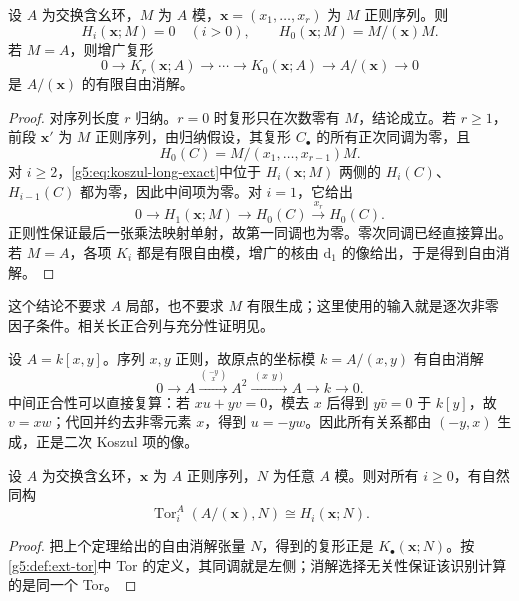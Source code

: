 \begin{theorem}\label{g5:thm:regular-koszul-acyclic}
	设 \(A\) 为交换含幺环，\(M\) 为 \(A\) 模，\(\mathbf x=(x_1,\ldots,x_r)\) 为 \(M\) 正则序列。则
	\[
		H_i(\mathbf x;M)=0\quad(i>0),\qquad
		H_0(\mathbf x;M)=M/(\mathbf x)M.
	\]
	若 \(M=A\)，则增广复形
	\[
		0\longrightarrow K_r(\mathbf x;A)\longrightarrow\cdots
		\longrightarrow K_0(\mathbf x;A)
		\longrightarrow A/(\mathbf x)\longrightarrow0
	\]
	是 \(A/(\mathbf x)\) 的有限自由消解。
\end{theorem}
\begin{proof}
	对序列长度 \(r\) 归纳。\(r=0\) 时复形只在次数零有 \(M\)，结论成立。若 \(r\geq1\)，前段 \(\mathbf x'\) 为 \(M\) 正则序列，由归纳假设，其复形 \(C_\bullet\) 的所有正次同调为零，且
	\[
		H_0(C)=M/(x_1,\ldots,x_{r-1})M.
	\]
	对 \(i\geq2\)，\eqref{g5:eq:koszul-long-exact}中位于 \(H_i(\mathbf x;M)\) 两侧的 \(H_i(C)\)、\(H_{i-1}(C)\) 都为零，因此中间项为零。对 \(i=1\)，它给出
	\[
		0\longrightarrow H_1(\mathbf x;M)
		\longrightarrow H_0(C)\xrightarrow{x_r}H_0(C).
	\]
	正则性保证最后一张乘法映射单射，故第一同调也为零。零次同调已经直接算出。若 \(M=A\)，各项 \(K_i\) 都是有限自由模，增广的核由 \(\mathrm d_1\) 的像给出，于是得到自由消解。
\end{proof}

这个结论不要求 \(A\) 局部，也不要求 \(M\) 有限生成；这里使用的输入就是逐次非零因子条件。相关长正合列与充分性证明见\cite[第16节，定理16.4—16.5，第127—129页]{Matsumura1989}。

\begin{example}\label{g5:exm:koszul-plane-origin}
	设 \(A=k[x,y]\)。序列 \(x,y\) 正则，故原点的坐标模 \(k=A/(x,y)\) 有自由消解
	\[
		0\longrightarrow A
		\xrightarrow{\binom{-y}{x}}A^2
		\xrightarrow{\ (x\ \ y)\ }A
		\longrightarrow k\longrightarrow0.
	\]
	中间正合性可以直接复算：若 \(xu+yv=0\)，模去 \(x\) 后得到 \(y\bar v=0\) 于 \(k[y]\)，故 \(v=xw\)；代回并约去非零元素 \(x\)，得到 \(u=-yw\)。因此所有关系都由 \((-y,x)\) 生成，正是二次 Koszul 项的像。
\end{example}

\begin{corollary}\label{g5:cor:koszul-computes-tor}
	设 \(A\) 为交换含幺环，\(\mathbf x\) 为 \(A\) 正则序列，\(N\) 为任意 \(A\) 模。则对所有 \(i\geq0\)，有自然同构
	\[
		\operatorname{Tor}_i^A(A/(\mathbf x),N)
		\cong H_i(\mathbf x;N).
	\]
\end{corollary}
\begin{proof}
	把上个定理给出的自由消解张量 \(N\)，得到的复形正是 \(K_\bullet(\mathbf x;N)\)。按\cref{g5:def:ext-tor}中 Tor 的定义，其同调就是左侧；消解选择无关性保证该识别计算的是同一个 Tor。
\end{proof}

